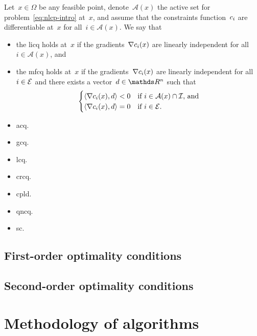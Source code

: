 \begin{definition}
    Let~$x \in \Omega$ be any feasible point, denote~$\mathcal{A}(x)$ the active set for problem~\cref{eq:nlcp-intro} at~$x$, and assume that the constraints function~$c_{i}$ are differentiable at~$x$ for all~$i \in \mathcal{A}(x)$.
    We say that
    \begin{itemize}
        \item the \gls{licq} holds at~$x$ if the gradients~$\nabla c_{i}(x)$ are linearly independent for all~$i \in \mathcal{A}(x)$, and
        \item the \gls{mfcq} holds at~$x$ if the gradients~$\nabla c_{i}(x)$ are linearly independent for all~$i \in \mathcal{E}$ and there exists a vector~$d \in \R^n$ such that
        \begin{equation*}
            \begin{cases}
                \langle\nabla c_{i}(x), d\rangle < 0    & \text{if~$i \in \mathcal{A}(x) \cap \mathcal{I}$, and}\\
                \langle\nabla c_{i}(x), d\rangle = 0    & \text{if~$i \in \mathcal{E}$}.
            \end{cases}
        \end{equation*}
    \end{itemize}
\end{definition}

\begin{itemize}
    \item \gls{acq}.
    \item \gls{gcq}.
    \item \gls{lcq}.
    \item \gls{crcq}.
    \item \gls{cpld}.
    \item \gls{qncq}.
    \item \gls{sc}.
\end{itemize}

\subsection{First-order optimality conditions}

\subsection{Second-order optimality conditions}

\section{Methodology of  algorithms}


